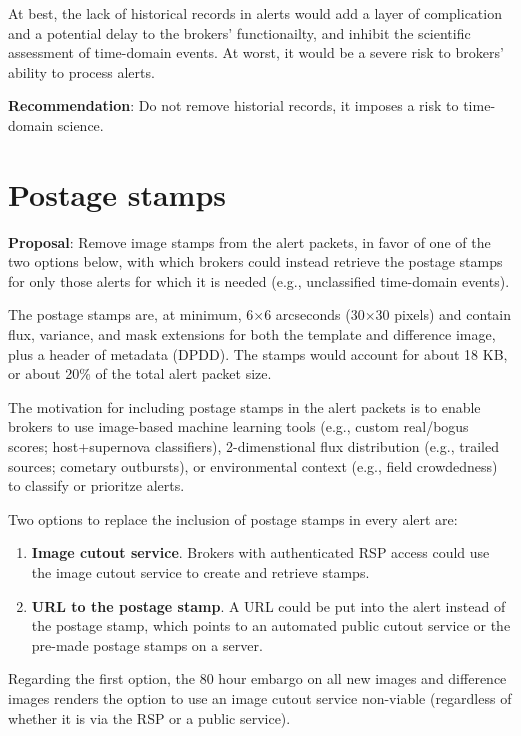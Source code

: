 \documentclass[DM,authoryear,toc]{lsstdoc}
\begin{document}
At best, the lack of historical records in alerts would add a layer of complication and a potential delay to the brokers' 
functionailty, and inhibit the scientific assessment of time-domain events.
At worst, it would be a severe risk to brokers' ability to process alerts.

\textbf{Recommendation}: Do not remove historial records, it imposes a risk to time-domain science.


\section{Postage stamps}\label{sec:stamps}

\textbf{Proposal}: Remove image stamps from the alert packets, in favor of one of the two options below, 
with which brokers could instead retrieve the postage stamps for only those alerts for which it is needed 
(e.g., unclassified time-domain events).

The postage stamps are, at minimum, 6$\times$6 arcseconds (30$\times$30 pixels) and contain flux, variance, 
and mask extensions for both the template and difference image, plus a header of metadata (DPDD).
The stamps would account for about 18 KB, or about 20\% of the total alert packet size.

The motivation for including postage stamps in the alert packets is to enable brokers to use image-based 
machine learning tools (e.g., custom real/bogus scores; host+supernova classifiers), 2-dimenstional flux distribution 
(e.g., trailed sources; cometary outbursts), or environmental context (e.g., field crowdedness) to classify or prioritze alerts.

Two options to replace the inclusion of postage stamps in every alert are:
\begin{enumerate}
\item \textbf{Image cutout service}. Brokers with authenticated RSP access could use the image cutout service to 
create and retrieve stamps.
\item \textbf{URL to the postage stamp}. A URL could be put into the alert instead of the postage stamp, which 
points to an automated public cutout service or the pre-made postage stamps on a server.
\end{enumerate}

Regarding the first option, the 80 hour embargo on all new images and difference images renders the option to use 
an image cutout service non-viable (regardless of whether it is via the RSP or a public service).
\end{document}
